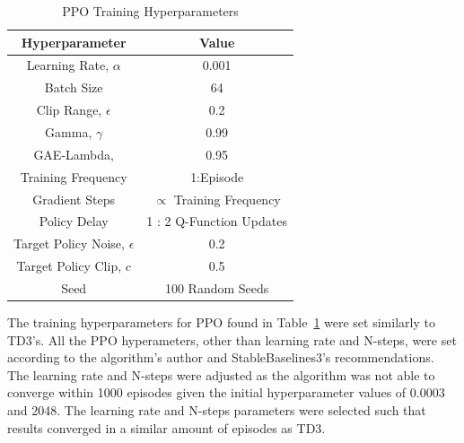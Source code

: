 \documentclass[10pt,twocolumn,letterpaper]{article}
\begin{document}
%
%
\begin{table}[t]
        \caption{PPO Training Hyperparameters}
        \vspace{-4mm}
        \label{tab:training_hyperameters_PPO}
        \begin{center}
        \begin{tabular}{|c||c|}
        \hline
        Hyperparameter                  & Value                           \\
        \hline
        Learning Rate, $\alpha$         & 0.001                           \\
        Batch Size                      & 64                              \\
        Clip Range, $\epsilon $         & 0.2                             \\
        Gamma, $\gamma$                 & 0.99                            \\
        GAE-Lambda,                     & 0.95                            \\
        Training Frequency              & 1:Episode                       \\
        Gradient Steps                  & $\propto$ Training Frequency    \\
        Policy Delay                    & 1 : 2 Q-Function Updates        \\
        Target Policy Noise, $\epsilon$ & 0.2                             \\
        Target Policy Clip, $c$         & 0.5                             \\
        Seed                            & 100 Random Seeds                \\
        \hline
        \end{tabular}
        \end{center}
        \vspace{-5mm}
\end{table}
%

The training hyperparameters for PPO found in Table~\ref{tab:training_hyperameters_PPO} were set similarly to TD3's. All the PPO hyperameters, other than learning rate and N-steps, were set according to the algorithm's author and StableBaselines3's recommendations.
The learning rate and N-steps were adjusted as the algorithm was not able to converge within 1000 episodes given the initial hyperparameter values of 0.0003 and 2048. The learning rate and N-steps parameters were selected such that results converged in a similar amount of
episodes as TD3.
\end{document}
